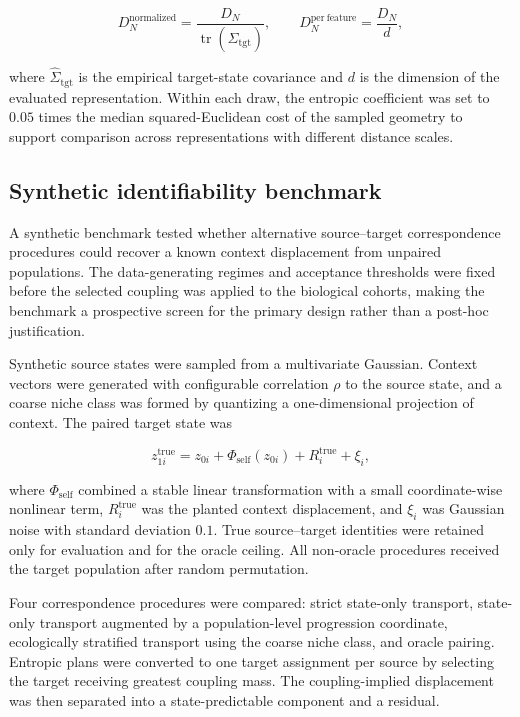 \begin{equation}
D_N^{\mathrm{normalized}}
=
\frac{
D_N
}{
\operatorname{tr}
\left(
\widehat{\Sigma}_{\mathrm{tgt}}
\right)
},
\qquad
D_N^{\mathrm{per\ feature}}
=
\frac{D_N}{d},
\label{eq:methods-dn-normalized}
\end{equation}

where \(\widehat{\Sigma}_{\mathrm{tgt}}\) is the empirical target-state
covariance and \(d\) is the dimension of the evaluated representation. Within
each draw, the entropic coefficient was set to \(0.05\) times the median
squared-Euclidean cost of the sampled geometry to support comparison across
representations with different distance scales.

\subsection{Synthetic identifiability benchmark}
\label{sec:methods-synthetic-identifiability}

A synthetic benchmark tested whether alternative source--target correspondence
procedures could recover a known context displacement from unpaired
populations. The data-generating regimes and acceptance thresholds were fixed
before the selected coupling was applied to the biological cohorts, making the
benchmark a prospective screen for the primary design rather than a post-hoc
justification.

Synthetic source states were sampled from a multivariate Gaussian. Context
vectors were generated with configurable correlation \(\rho\) to the source
state, and a coarse niche class was formed by quantizing a one-dimensional
projection of context. The paired target state was

\begin{equation}
z_{1i}^{\mathrm{true}}
=
z_{0i}
+
\Phi_{\mathrm{self}}(z_{0i})
+
R_i^{\mathrm{true}}
+
\xi_i,
\label{eq:methods-synthetic-dgp}
\end{equation}

where \(\Phi_{\mathrm{self}}\) combined a stable linear transformation with a
small coordinate-wise nonlinear term,
\(R_i^{\mathrm{true}}\) was the planted context displacement, and
\(\xi_i\) was Gaussian noise with standard deviation \(0.1\). True
source--target identities were retained only for evaluation and for the oracle
ceiling. All non-oracle procedures received the target population after random
permutation.

Four correspondence procedures were compared: strict state-only transport,
state-only transport augmented by a population-level progression coordinate,
ecologically stratified transport using the coarse niche class, and oracle
pairing. Entropic plans were converted to one target assignment per source by
selecting the target receiving greatest coupling mass. The coupling-implied
displacement was then separated into a state-predictable component and a
residual.

